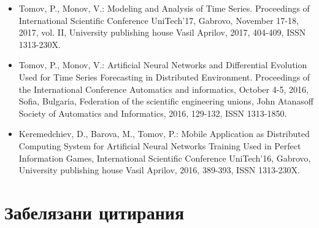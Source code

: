 \begin{itemize}
\item Tomov, P., Monov, V.: Modeling and Analysis of Time Series. Proceedings of International Scientific Conference UniTech’17, Gabrovo, November 17-18, 2017, vol. II, University publishing house Vasil Aprilov, 2017, 404-409, ISSN 1313-230X.

\item Tomov, P., Monov, V.: Artificial Neural Networks and Differential Evolution Used for Time Series Forecasting in Distributed Environment. Proceedings of the International Conference Automatics and informatics, October 4-5, 2016, Sofia, Bulgaria, Federation of the scientific engineering unions, John Atanasoff Society of Automatics and Informatics, 2016, 129-132, ISSN 1313-1850.

\item Keremedchiev, D., Barova, M., Tomov, P.: Mobile Application as Distributed Computing System for Artificial Neural Networks Training Used in Perfect Information Games, International Scientific Conference UniTech’16, Gabrovo, University publishing house Vasil Aprilov, 2016, 389-393, ISSN 1313-230X.
\end{itemize}

\section*{Забелязани цитирания}

